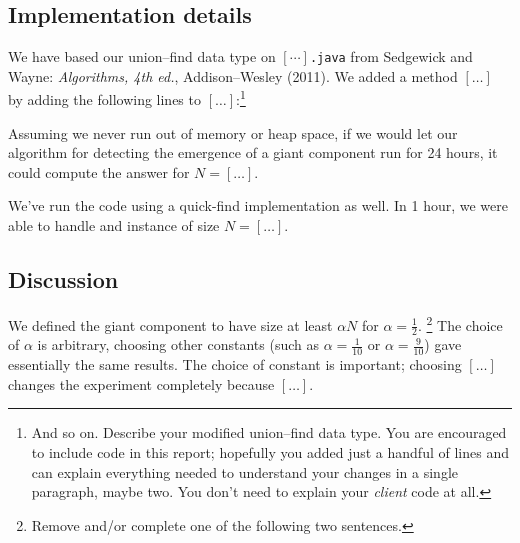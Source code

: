\documentclass{tufte-handout}
\begin{document}
\subsection{Implementation details}

We have based our union--find data type on $[\cdots]${\tt .java} from Sedgewick and Wayne: {\em Algorithms, 4th ed.}, Addison--Wesley (2011).
We added a method $[\ldots]$ by adding the following lines to $[\dots]$:\footnote{And so on. Describe your modified union--find data type.
You are encouraged to include code in this report; hopefully you added just a handful of lines and can explain everything needed to understand your changes in a single paragraph, maybe two. 
You don't need to explain your \emph{client} code at all.}

Assuming we never run out of memory or heap space, if we would let our algorithm for detecting the emergence of a giant component run for 24 hours, it could compute the answer for $N= [\ldots]$.

We've run the code using a quick-find implementation as well.
In 1 hour, we were able to handle and instance of size $N=[\ldots]$.



\subsection{Discussion}

We defined the giant component to have size at least $\alpha N$ for $\alpha = \frac{1}{2}$. \footnote{Remove and/or complete one of the following two sentences.}
The choice of $\alpha$ is arbitrary, choosing other constants (such as $\alpha=\frac{1}{10}$ or $\alpha=\frac{9}{10}$) gave essentially the same results.
The choice of constant is important; choosing $[\ldots]$ changes the experiment completely because $[\ldots]$.
\end{document}
